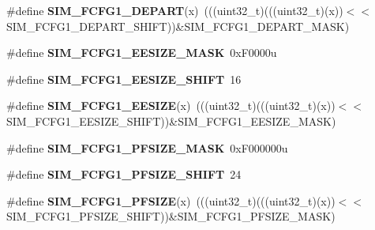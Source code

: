 \begin{DoxyCompactItemize}
\item 
\#define {\bfseries S\+I\+M\+\_\+\+F\+C\+F\+G1\+\_\+\+D\+E\+P\+A\+RT}(x)~(((uint32\+\_\+t)(((uint32\+\_\+t)(x))$<$$<$S\+I\+M\+\_\+\+F\+C\+F\+G1\+\_\+\+D\+E\+P\+A\+R\+T\+\_\+\+S\+H\+I\+FT))\&S\+I\+M\+\_\+\+F\+C\+F\+G1\+\_\+\+D\+E\+P\+A\+R\+T\+\_\+\+M\+A\+SK)\hypertarget{group__SIM__Register__Masks_ga68137c3e32ef5c0477b548ad10de565f}{}\label{group__SIM__Register__Masks_ga68137c3e32ef5c0477b548ad10de565f}

\item 
\#define {\bfseries S\+I\+M\+\_\+\+F\+C\+F\+G1\+\_\+\+E\+E\+S\+I\+Z\+E\+\_\+\+M\+A\+SK}~0x\+F0000u\hypertarget{group__SIM__Register__Masks_gaf02a0b5e053242559c12e5d2834fd3c4}{}\label{group__SIM__Register__Masks_gaf02a0b5e053242559c12e5d2834fd3c4}

\item 
\#define {\bfseries S\+I\+M\+\_\+\+F\+C\+F\+G1\+\_\+\+E\+E\+S\+I\+Z\+E\+\_\+\+S\+H\+I\+FT}~16\hypertarget{group__SIM__Register__Masks_ga7e203fc4aaf06a3dbd257768f53dbf83}{}\label{group__SIM__Register__Masks_ga7e203fc4aaf06a3dbd257768f53dbf83}

\item 
\#define {\bfseries S\+I\+M\+\_\+\+F\+C\+F\+G1\+\_\+\+E\+E\+S\+I\+ZE}(x)~(((uint32\+\_\+t)(((uint32\+\_\+t)(x))$<$$<$S\+I\+M\+\_\+\+F\+C\+F\+G1\+\_\+\+E\+E\+S\+I\+Z\+E\+\_\+\+S\+H\+I\+FT))\&S\+I\+M\+\_\+\+F\+C\+F\+G1\+\_\+\+E\+E\+S\+I\+Z\+E\+\_\+\+M\+A\+SK)\hypertarget{group__SIM__Register__Masks_ga8c0cd6c77bd518794e6473dd0a2feca7}{}\label{group__SIM__Register__Masks_ga8c0cd6c77bd518794e6473dd0a2feca7}

\item 
\#define {\bfseries S\+I\+M\+\_\+\+F\+C\+F\+G1\+\_\+\+P\+F\+S\+I\+Z\+E\+\_\+\+M\+A\+SK}~0x\+F000000u\hypertarget{group__SIM__Register__Masks_ga5adf627ba4cd9516ebf3e0a6d33aa7c5}{}\label{group__SIM__Register__Masks_ga5adf627ba4cd9516ebf3e0a6d33aa7c5}

\item 
\#define {\bfseries S\+I\+M\+\_\+\+F\+C\+F\+G1\+\_\+\+P\+F\+S\+I\+Z\+E\+\_\+\+S\+H\+I\+FT}~24\hypertarget{group__SIM__Register__Masks_gaec8960bc114f5539e22701491dcf58f7}{}\label{group__SIM__Register__Masks_gaec8960bc114f5539e22701491dcf58f7}

\item 
\#define {\bfseries S\+I\+M\+\_\+\+F\+C\+F\+G1\+\_\+\+P\+F\+S\+I\+ZE}(x)~(((uint32\+\_\+t)(((uint32\+\_\+t)(x))$<$$<$S\+I\+M\+\_\+\+F\+C\+F\+G1\+\_\+\+P\+F\+S\+I\+Z\+E\+\_\+\+S\+H\+I\+FT))\&S\+I\+M\+\_\+\+F\+C\+F\+G1\+\_\+\+P\+F\+S\+I\+Z\+E\+\_\+\+M\+A\+SK)\hypertarget{group__SIM__Register__Masks_ga7527f7f4bdcd4c0b2baf6c99a5b6735a}{}\label{group__SIM__Register__Masks_ga7527f7f4bdcd4c0b2baf6c99a5b6735a}


\end{DoxyCompactItemize}
